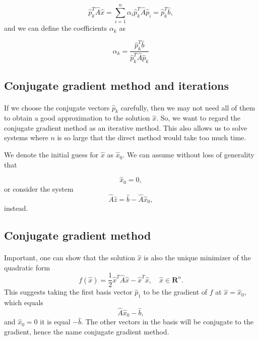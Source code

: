 \documentclass[%
twoside,                 %
final,                   %
10pt]{article}
\begin{document}
\begin{equation*}
  \hat{p}_k^T \hat{A}\hat{x} = \sum^{n}_{i=1} \alpha_i\hat{p}_k^T \hat{A}\hat{p}_i= \hat{p}_k^T \hat{b},
\end{equation*}
and we can define the coefficients $\alpha_k$ as

\begin{equation*}
    \alpha_k = \frac{\hat{p}_k^T \hat{b}}{\hat{p}_k^T \hat{A} \hat{p}_k}
\end{equation*}



\subsection*{Conjugate gradient method and iterations}

\paragraph{}

If we choose the conjugate vectors $\hat{p}_k$ carefully, 
then we may not need all of them to obtain a good approximation to the solution 
$\hat{x}$. 
So, we want to regard the conjugate gradient method as an iterative method. 
This also allows us to solve systems where $n$ is so large that the direct 
method would take too much time.

We denote the initial guess for $\hat{x}$ as $\hat{x}_0$. 
We can assume without loss of generality that

\begin{equation*}
\hat{x}_0=0,
\end{equation*}
or consider the system
\begin{equation*}
\hat{A}\hat{z} = \hat{b}-\hat{A}\hat{x}_0,
\end{equation*}
instead.




\subsection*{Conjugate gradient method}

\paragraph{}
Important, one can show that the solution $\hat{x}$ is also the unique minimizer of the quadratic form
\begin{equation*}
  f(\hat{x}) = \frac{1}{2}\hat{x}^T\hat{A}\hat{x} - \hat{x}^T \hat{x} , \quad \hat{x}\in\mathbf{R}^n. 
\end{equation*}
This suggests taking the first basis vector $\hat{p}_1$ 
to be the gradient of $f$ at $\hat{x}=\hat{x}_0$, 
which equals
\begin{equation*}
\hat{A}\hat{x}_0-\hat{b},
\end{equation*}
and 
$\hat{x}_0=0$ it is equal $-\hat{b}$.
The other vectors in the basis will be conjugate to the gradient, 
hence the name conjugate gradient method.
\end{document}
